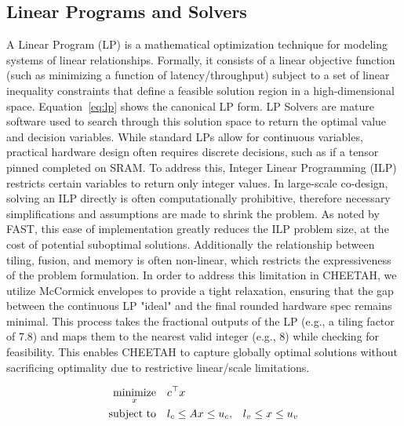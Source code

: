 \subsection{Linear Programs and Solvers}
\label{app:lps}
A Linear Program (LP) is a mathematical optimization technique for modeling systems of linear relationships. Formally, it consists of a linear objective function (such as minimizing a function of latency/throughput) subject to a set of linear inequality constraints that define a feasible solution region in a high-dimensional space. Equation~\ref{eq:lp} shows the canonical LP form. LP Solvers are mature software used to search through this solution space to return the optimal value and decision variables. While standard LPs allow for continuous variables, practical hardware design often requires discrete decisions, such as if a tensor pinned completed on SRAM. To address this, Integer Linear Programming (ILP) restricts certain variables to return only integer values. In large-scale co-design, solving an ILP directly is often computationally prohibitive, therefore necessary simplifications and assumptions are made to shrink the problem. As noted by FAST, this ease of implementation greatly reduces the ILP problem size, at the cost of potential suboptimal solutions. Additionally the relationship between tiling, fusion, and memory is often non-linear, which restricts the expressiveness of the problem formulation. In order to address this limitation in CHEETAH, we utilize McCormick envelopes to provide a tight relaxation, ensuring that the gap between the continuous LP "ideal" and the final rounded hardware spec remains minimal. This process takes the fractional outputs of the LP (e.g., a tiling factor of 7.8) and maps them to the nearest valid integer (e.g., 8) while checking for feasibility. This enables CHEETAH to capture globally optimal solutions without sacrificing optimality due to restrictive linear/scale limitations.

\begin{equation}
\begin{aligned}
    \operatorname*{minimize}_{x} \quad & c^\top x \\
    \text{subject to} \quad
    & l_c \leq A x \leq u_c,
    & l_v \leq x \leq u_v
\end{aligned}
\label{eq:lp}
\end{equation}

